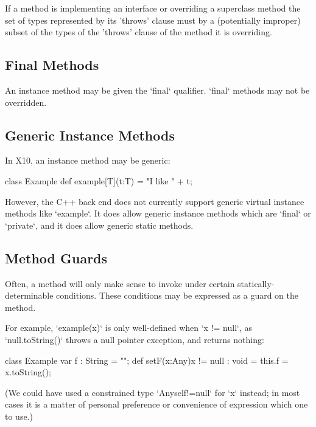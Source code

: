 If a method is implementing an interface or overriding a superclass
method the set of types represented by its \xcd'throws' clause must by
a (potentially improper) subset of the types of the \xcd'throws'
clause of the method it is overriding. 

\subsection{Final Methods}
An instance method may be given the \xcd`final` qualifier.  \xcd`final`
methods may not be overridden.

\subsection{Generic Instance Methods}

\limitationx{}
In X10, an instance method may be generic: 
\begin{xten}
class Example {
  def example[T](t:T) = "I like " + t;
}
\end{xten}
%

However, the C++ back end does not currently support generic virtual instance
methods like \xcd`example`.  It does allow generic instance methods which are
\xcd`final` or \xcd`private`, and it does allow generic static methods.  


\subsection{Method Guards}
\label{MethodGuard}

Often, a method will only make sense to invoke under certain
statically-determinable conditions.  These conditions may be expressed as a
guard on the method.

\begin{ex}
For example, \xcd`example(x)` is only
well-defined when \xcd`x != null`, as \xcd`null.toString()` throws a null
pointer exception, and returns nothing: 
% 
\begin{xten}
class Example {
   var f : String = "";
   def setF(x:Any){x != null} : void = {
      this.f = x.toString();
   }
}
\end{xten}
%
\noindent
(We could have used a constrained type \xcd`Any{self!=null}` for \xcd`x`
instead; in
most cases it is a matter of personal preference or convenience of expression
which one to use.) 
\end{ex}


